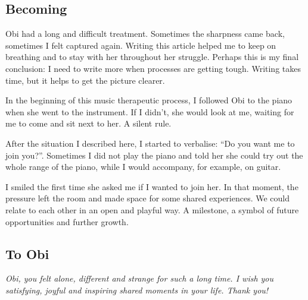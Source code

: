 \documentclass[authordate, empirical, issue]{jote-new-article}
\begin{document}
\begin{itemize}
\end{itemize}





\subsection{Becoming}

Obi had a long and difficult treatment. Sometimes the sharpness came back, sometimes I felt captured again. Writing this article helped me to keep on breathing and to stay with her throughout her struggle. Perhaps this is my final conclusion: I need to write more when processes are getting tough. Writing takes time, but it helps to get the picture clearer.







In the beginning of this music therapeutic process, I followed Obi to the piano when she went to the instrument. If I didn't, she would look at me, waiting for me to come and sit next to her. A silent rule.



After the situation I described here, I started to verbalise: “Do you want me to join you?”. Sometimes I did not play the piano and told her she could try out the whole range of the piano, while I would accompany, for example, on guitar.



I smiled the first time she asked me if I wanted to join her. In that moment, the pressure left the room and made space for some shared experiences. We could relate to each other in an open and playful way. A milestone, a symbol of future opportunities and further growth.







\subsection{To Obi}

{\emph{Obi, you felt alone, different and strange for such a long time. I wish you satisfying, joyful and inspiring shared moments in your life. Thank you!}}
\end{document}
